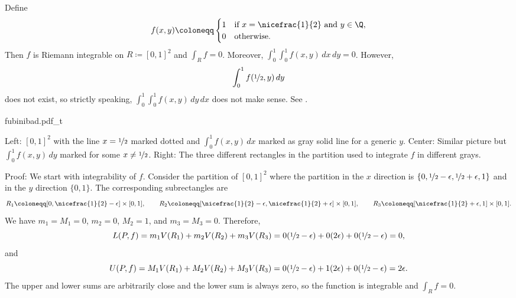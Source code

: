 \begin{example}
Define 
\begin{equation*}
f(x,y) \coloneqq 
\begin{cases}
1 & \text{if } x=\nicefrac{1}{2} \text{ and } y \in \Q, \\
0 & \text{otherwise.}
\end{cases}
\end{equation*}
Then $f$ is Riemann integrable on $R \coloneqq [0,1]^2$ and $\int_R f = 0$.
Moreover, $\int_0^1 \int_0^1 f(x,y) \, dx \, dy = 0$.
However,
\begin{equation*}
\int_0^1 f(\nicefrac{1}{2},y) \, dy
\end{equation*}
does not exist, so strictly speaking,
$\int_0^1 \int_0^1 f(x,y) \, dy \, dx$
does not make sense.
See .

\begin{myfigureht}
{fubinibad.pdf_t}
\caption{Left: $[0,1]^2$ with the line $x=\nicefrac{1}{2}$ marked
dotted and $\int_0^1 f(x,y) \, dx$ marked as gray solid line for a generic $y$.
Center: Similar picture but $\int_0^1 f(x,y) \, dy$
marked for some $x \not= \nicefrac{1}{2}$.
Right: The three different rectangles in the partition used to integrate $f$
in different grays.\label{fig:fubinibad}}
\end{myfigureht}

Proof:
We start with integrability of $f$.  Consider the partition
of $[0,1]^2$ where the partition in the $x$ direction is
$\{ 0, \nicefrac{1}{2}-\epsilon,
\nicefrac{1}{2}+\epsilon,1\}$ and in the $y$ direction $\{ 0, 1 \}$.
The corresponding subrectangles are
\begin{equation*}
R_1 \coloneqq [0, \nicefrac{1}{2}-\epsilon] \times [0,1],
\qquad
R_2 \coloneqq [\nicefrac{1}{2}-\epsilon,
\nicefrac{1}{2}+\epsilon] \times [0,1],
\qquad
R_3 \coloneqq [\nicefrac{1}{2}+\epsilon,1] \times [0,1] .
\end{equation*}
We have $m_1 = M_1 = 0$, $m_2 =0$, $M_2 = 1$, and $m_3 = M_3 = 0$.
Therefore,
\begin{equation*}
L(P,f) = 
m_1 V(R_1)
+
m_2 V(R_2)
+
m_3 V(R_3)
=
0 (\nicefrac{1}{2}-\epsilon)
+
0 (2\epsilon)
+
0 (\nicefrac{1}{2}-\epsilon) = 0 ,
\end{equation*}
and
\begin{equation*}
U(P,f) = 
M_1 V(R_1)
+
M_2 V(R_2)
+
M_3 V(R_3)
=
0 (\nicefrac{1}{2}-\epsilon)
+
1 (2\epsilon)
+
0 (\nicefrac{1}{2}-\epsilon) = 2 \epsilon .
\end{equation*}
The upper and lower sums are arbitrarily close and the lower sum is always
zero, so the function is integrable and $\int_R f = 0$.


\end{example}
